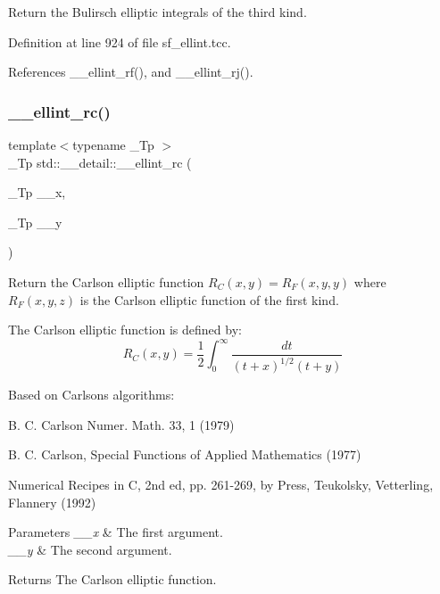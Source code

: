 Return the Bulirsch elliptic integrals of the third kind. 

Definition at line 924 of file sf\+\_\+ellint.\+tcc.



References \+\_\+\+\_\+ellint\+\_\+rf(), and \+\_\+\+\_\+ellint\+\_\+rj().

\mbox{\label{namespacestd_1_1____detail_aa7d81e41240a6d031414c6b117889e36}} 
\subsubsection{\texorpdfstring{\+\_\+\+\_\+ellint\+\_\+rc()}{\_\_ellint\_rc()}}
{\footnotesize\ttfamily template$<$typename \+\_\+\+Tp $>$ \\
\+\_\+\+Tp std\+::\+\_\+\+\_\+detail\+::\+\_\+\+\_\+ellint\+\_\+rc (\begin{DoxyParamCaption}\item[{\+\_\+\+Tp}]{\+\_\+\+\_\+x,  }\item[{\+\_\+\+Tp}]{\+\_\+\+\_\+y }\end{DoxyParamCaption})}



Return the Carlson elliptic function $ R_C(x,y) = R_F(x,y,y) $ where $ R_F(x,y,z) $ is the Carlson elliptic function of the first kind. 

The Carlson elliptic function is defined by\+: \[ R_C(x,y) = \frac{1}{2} \int_0^\infty \frac{dt}{(t + x)^{1/2}(t + y)} \]

Based on Carlson\textquotesingle{}s algorithms\+:
\begin{DoxyItemize}
\item B. C. Carlson Numer. Math. 33, 1 (1979)
\item B. C. Carlson, Special Functions of Applied Mathematics (1977)
\item Numerical Recipes in C, 2nd ed, pp. 261-\/269, by Press, Teukolsky, Vetterling, Flannery (1992)
\end{DoxyItemize}


\begin{DoxyParams}{Parameters}
{\em \+\_\+\+\_\+x} & The first argument. \\
\hline
{\em \+\_\+\+\_\+y} & The second argument. \\
\hline
\end{DoxyParams}
\begin{DoxyReturn}{Returns}
The Carlson elliptic function. 
\end{DoxyReturn}


